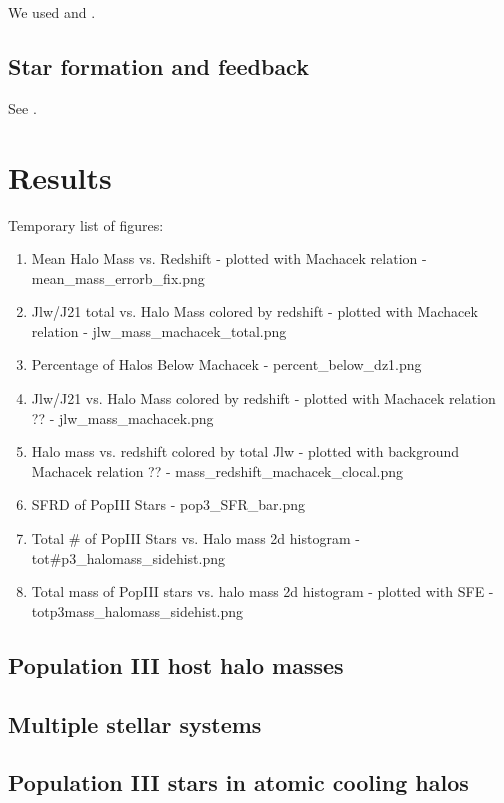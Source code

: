 \documentclass[a4paper,fleqn,usenatbib]{mnras}
\begin{document}
We used \enzo{} \citep{Enzo} and \yt{} \citep{yt_full_paper}.

\subsection{Star formation and feedback}

See \citet{Wise14}.

\section{Results}

Temporary list of figures:
\begin{enumerate}
\item Mean Halo Mass vs. Redshift - plotted with Machacek relation - mean\_mass\_errorb\_fix.png
\item Jlw/J21 total vs. Halo Mass colored by redshift - plotted with Machacek relation - jlw\_mass\_machacek\_total.png
\item Percentage of Halos Below Machacek - percent\_below\_dz1.png 
\item Jlw/J21 vs. Halo Mass colored by redshift - plotted with Machacek relation ??  - jlw\_mass\_machacek.png
\item Halo mass vs. redshift colored by total Jlw - plotted with background Machacek relation ?? - mass\_redshift\_machacek\_clocal.png
\item SFRD of PopIII Stars - pop3\_SFR\_bar.png
\item Total # of PopIII Stars vs. Halo mass 2d histogram - tot\#p3\_halomass\_sidehist.png
\item Total mass of PopIII stars vs. halo mass 2d histogram - plotted with SFE - totp3mass\_halomass\_sidehist.png

\end{enumerate}

\subsection{Population III host halo masses}

\subsection{Multiple stellar systems}

\subsection{Population III stars in atomic cooling halos}
\end{document}
